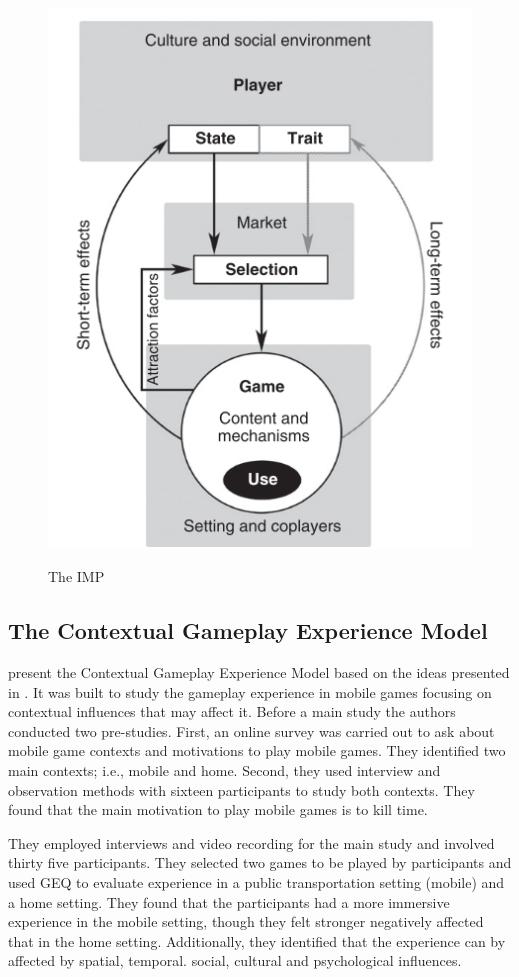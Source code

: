 \begin{figure}[bth]
\myfloatalign
{\includegraphics[width=.6\linewidth]{gfx/ref_framework/IMP_Model}} \quad
\caption[The \ac{IMP}]{The \ac{IMP} \autocite{Elson2014}}\label{fig:IMP_Model}
\end{figure}

\subsection{The Contextual Gameplay Experience Model}
\textcite{Engl2013} present the Contextual Gameplay Experience Model based on the ideas presented in \autocite{Nackea2,Nacked}. It was built to study the gameplay experience in mobile games focusing on contextual influences that may affect it. Before a main study the authors conducted two pre-studies. First, an online survey was carried out to ask about mobile game contexts and motivations to play mobile games. They identified two main contexts; i.e., mobile and home. Second, they used interview and observation methods with sixteen participants to study both contexts. They found that the main motivation to play mobile games is to kill time.

They employed interviews and video recording for the main study and involved thirty five participants. They selected two games to be played by participants and used \ac{GEQ} to evaluate experience in a public transportation setting (mobile) and a home setting. They found that the participants had a more immersive experience in the mobile setting, though they felt stronger negatively affected that in the home setting. Additionally, they identified that the experience can by affected by spatial, temporal. social, cultural and psychological influences.

